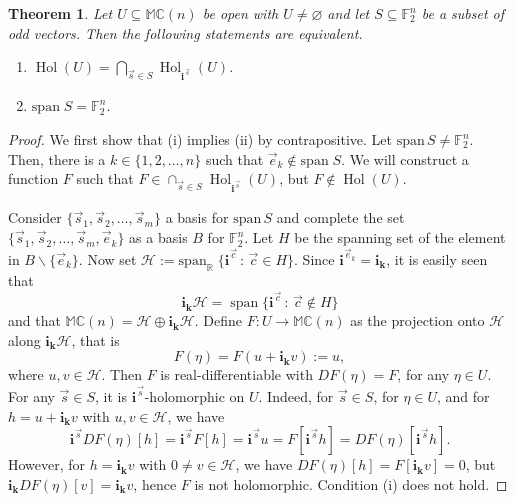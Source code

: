 \documentclass[12pt]{amsart}
\theoremstyle{plain}
\newtheorem{theorem}{Theorem}[section]
\theoremstyle{definition}
\numberwithin{equation}{section}
\newcommand{\im}[1]{\mathbf{ i_{#1}}}
\newcommand{\mC}{\mathbb{C}}
\newcommand{\mM}{\mathbb{M}}
\newcommand{\ra}{\rightarrow}
\DeclareMathOperator{\hol}{Hol}
\begin{document}
\begin{theorem}\label{T:EquivalenceSpanSWithHolomorphy}
    Let $U \subseteq \mM \mC (n)$ be open with $U \neq \varnothing$ and let $S \subseteq \mathbb{F}_2^n$ be a subset of odd vectors. Then the following statements are equivalent. 
    \begin{enumerate}[label=(\roman*)]
        \item $\displaystyle\hol (U) = \bigcap_{\vec{s} \in S} \hol_{\im{}^{\vec{s}}} (U)$.
        \item $\mathrm{span} \; S = \mathbb{F}_2^n$. 
    \end{enumerate}
\end{theorem}
\begin{proof}
    We first show that (i) implies (ii) by contrapositive. Let $\mathrm{span} \, S \neq \mathbb{F}_2^n$. Then, there is a $k \in \{ 1, 2, \ldots , n \}$ such that $\vec{e}_k \not\in \mathrm{span} \; S$. We will construct a function $F$ such that $F \in \cap_{\vec{s} \in S} \hol_{\im{}^{\vec{s}}} (U)$, but $F \not\in \hol (U)$. 
    
    Consider $\{\vec{s}_1, \vec{s}_2, \ldots , \vec{s}_m \}$ a basis for $\mathrm{span} \, S$ and complete the set $\{ \vec{s}_1 , \vec{s}_2 , \ldots , \vec{s}_m, \vec{e}_k \}$ as a basis $B$ for $\mathbb{F}_2^n$. Let $H$ be the spanning set of the element in $B \backslash \{ \vec{e}_k \}$. Now set $\mathcal{H} := \mathrm{span}_{\mathbb{R}} \; \{ \im{}^{\vec{c}} \, : \, \vec{c} \in H \}$. Since $\im{}^{\vec{e}_k} = \im{k}$, it is easily seen that 
    $$ 
    \im{k} \mathcal{H} = \operatorname{span} \{ \im{}^{\vec{c}} \, : \, \vec{c} \not\in H \}
    $$
    and that $\mM \mC (n) = \mathcal{H} \oplus \im{k} \mathcal{H}$. Define $F : U \ra \mM \mC (n)$ as the projection onto $\mathcal{H}$ along $\im{k} \mathcal{H}$, that is
        $$  
            F (\eta) = F (u + \im{k} v) := u,
        $$
    where $u, v \in \mathcal{H}$. Then $F$ is real-differentiable with $DF (\eta) = F$, for any $\eta \in U$. For any $\vec{s} \in S$, it is $\im{}^{\vec{s}}$-holomorphic on $U$. Indeed, for $\vec{s} \in S$, for $\eta \in U$, and for $h = u + \im{k} v$ with $u, v \in \mathcal{H}$, we have
        $$
            \im{}^{\vec{s}} DF (\eta) [h] = \im{}^{\vec{s}} F [h] = \im{}^{\vec{s}} u = F [\im{}^{\vec{s}} h] = DF (\eta ) [\im{}^{\vec{s}} h].
        $$
    However, for $h = \im{k} v$ with $0\neq v \in \mathcal{H}$, we have $DF (\eta ) [h] = F [\im{k} v] = 0$, but $\im{k} DF(\eta) [v] = \im{k} v$, hence $F$ is not holomorphic. Condition (i) does not hold. 


\end{proof}
\end{document}

